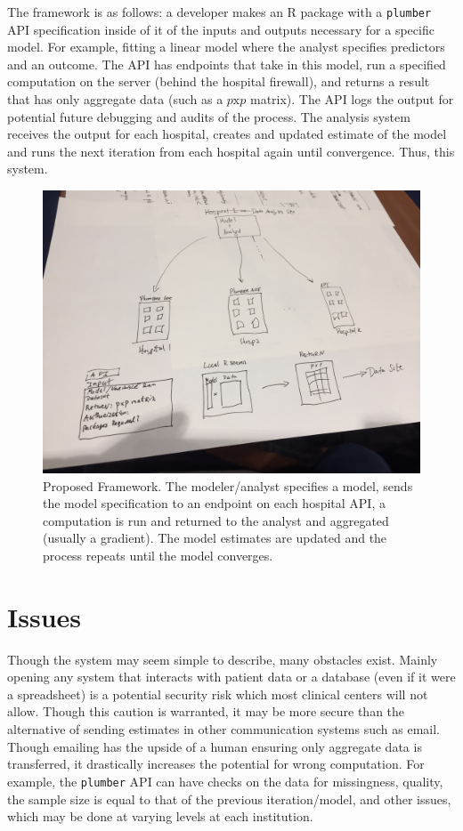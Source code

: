 \documentclass[]{elsarticle} %
\begin{document}
The framework is as follows: a developer makes an R package with a
\texttt{plumber} API specification inside of it of the inputs and
outputs necessary for a specific model. For example, fitting a linear
model where the analyst specifies predictors and an outcome. The API has
endpoints that take in this model, run a specified computation on the
server (behind the hospital firewall), and returns a result that has
only aggregate data (such as a \(p\text{x}p\) matrix). The API logs the
output for potential future debugging and audits of the process. The
analysis system receives the output for each hospital, creates and
updated estimate of the model and runs the next iteration from each
hospital again until convergence. Thus, this system.

\begin{figure}
\includegraphics[width=1\linewidth]{sketch} \caption{Proposed Framework.  The modeler/analyst specifies a model, sends the model specification to an endpoint on each hospital API, a computation is run and returned to the analyst and aggregated (usually a gradient).  The model estimates are updated and the process repeats until the model converges.  }\label{fig:unnamed-chunk-1}
\end{figure}

\hypertarget{issues}{%
\section{Issues}\label{issues}}

Though the system may seem simple to describe, many obstacles exist.
Mainly opening any system that interacts with patient data or a database
(even if it were a spreadsheet) is a potential security risk which most
clinical centers will not allow. Though this caution is warranted, it
may be more secure than the alternative of sending estimates in other
communication systems such as email. Though emailing has the upside of a
human ensuring only aggregate data is transferred, it drastically
increases the potential for wrong computation. For example, the
\texttt{plumber} API can have checks on the data for missingness,
quality, the sample size is equal to that of the previous
iteration/model, and other issues, which may be done at varying levels
at each institution.
\end{document}
